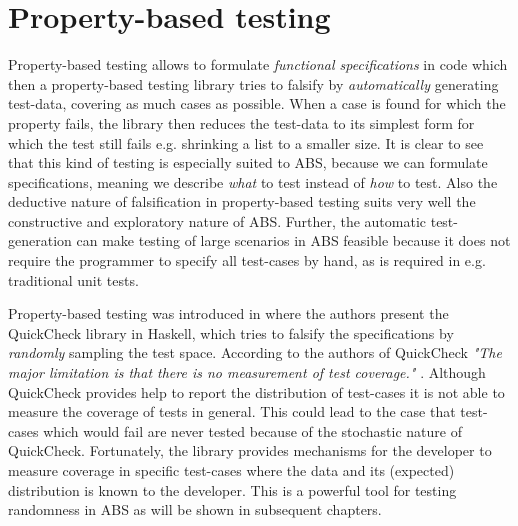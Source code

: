 \section*{Property-based testing}
\label{sec:proptesting}

Property-based testing allows to formulate \textit{functional specifications} in code which then a property-based testing library tries to falsify by \textit{automatically} generating test-data, covering as much cases as possible. When a case is found for which the property fails, the library then reduces the test-data to its simplest form for which the test still fails e.g. shrinking a list to a smaller size. It is clear to see that this kind of testing is especially suited to ABS, because we can formulate specifications, meaning we describe \textit{what} to test instead of \textit{how} to test. Also the deductive nature of falsification in property-based testing suits very well the constructive and exploratory nature of ABS. Further, the automatic test-generation can make testing of large scenarios in ABS feasible because it does not require the programmer to specify all test-cases by hand, as is required in e.g. traditional unit tests.

Property-based testing was introduced in \cite{claessen_quickcheck_2000,claessen_testing_2002} where the authors present the QuickCheck library in Haskell, which tries to falsify the specifications by \textit{randomly} sampling the test space. %
According to the authors of QuickCheck \textit{"The major limitation is that there is no measurement of test coverage."} \cite{claessen_quickcheck_2000}. Although QuickCheck provides help to report the distribution of test-cases it is not able to measure the coverage of tests in general. This could lead to the case that test-cases which would fail are never tested because of the stochastic nature of QuickCheck. Fortunately, the library provides mechanisms for the developer to measure coverage in specific test-cases where the data and its (expected) distribution is known to the developer. This is a powerful tool for testing randomness in ABS as will be shown in subsequent chapters.

